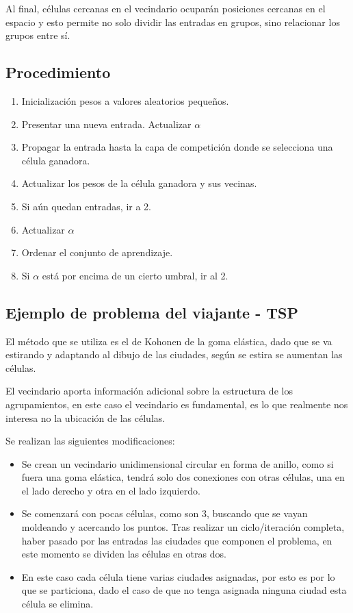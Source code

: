 \documentclass[12pt, twoside, openright]{report} %
\begin{document}
Al final, células cercanas en el vecindario ocuparán posiciones cercanas en el espacio y esto permite no solo dividir las entradas en grupos, sino relacionar los grupos entre sí.

\subsection{Procedimiento}
\begin{enumerate}
	\item Inicialización pesos a valores aleatorios pequeños.
	\item Presentar una nueva entrada. Actualizar $\alpha$
	\item Propagar la entrada hasta la capa de competición donde se selecciona una célula ganadora.
	\item Actualizar los pesos de la célula ganadora y sus vecinas.
	\item Si aún quedan entradas, ir a 2.
	\item Actualizar $\alpha$
	\item Ordenar el conjunto de aprendizaje.
	\item Si $\alpha$ está por encima de un cierto umbral, ir al 2.
\end{enumerate}

\subsection{Ejemplo de problema del viajante - TSP}
El método que se utiliza es el de Kohonen de la goma elástica, dado que se va estirando y adaptando al dibujo de las ciudades, según se estira se aumentan las células.

El vecindario aporta información adicional sobre la estructura de los agrupamientos, en este caso el vecindario es fundamental, es lo que realmente nos interesa no la ubicación de las células.

Se realizan las siguientes modificaciones:
\begin{itemize}
	\item Se crean un vecindario unidimensional circular en forma de anillo, como si fuera una goma elástica, tendrá solo dos conexiones con otras células, una en el lado derecho y otra en el lado izquierdo.
	\item Se comenzará con pocas células, como son 3, buscando que se vayan moldeando y acercando los puntos. Tras realizar un ciclo/iteración completa, haber pasado por las entradas las ciudades que componen el problema, en este momento se dividen las células en otras dos.
	\item En este caso cada célula tiene varias ciudades asignadas, por esto es por lo que se particiona, dado el caso de que no tenga asignada ninguna ciudad esta célula se elimina.
\end{itemize}
\end{document}
